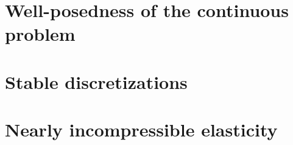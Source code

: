 
\section{Well-posedness of the continuous problem}

\section{Stable discretizations}

\section{Nearly incompressible elasticity}

